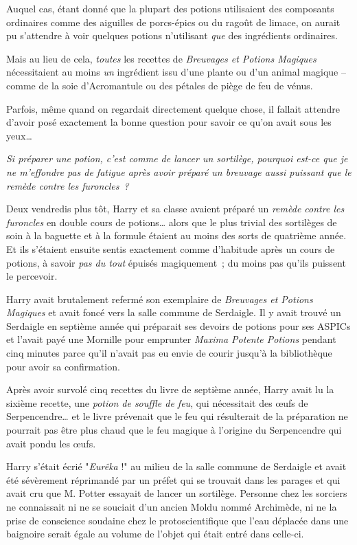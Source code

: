Auquel cas, étant donné que la plupart des potions utilisaient des composants ordinaires comme des aiguilles de porcs-épics ou du ragoût de limace, on aurait pu s'attendre à voir quelques potions n'utilisant \emph{que} des ingrédients ordinaires.

Mais au lieu de cela, \emph{toutes} les recettes de \emph{Breuvages et Potions Magiques} nécessitaient au moins \emph{un} ingrédient issu d'une plante ou d'un animal magique -- comme de la soie d'Acromantule ou des pétales de piège de feu de vénus.

Parfois, même quand on regardait directement quelque chose, il fallait attendre d'avoir posé exactement la bonne question pour savoir ce qu'on avait sous les yeux…

\emph{Si préparer une potion, c'est comme de lancer un sortilège, pourquoi est-ce que je ne m'effondre pas de fatigue après avoir préparé un breuvage aussi puissant que le remède contre les furoncles~?}

Deux vendredis plus tôt, Harry et sa classe avaient préparé un \emph{remède contre les furoncles} en double cours de potions… alors que le plus trivial des sortilèges de soin à la baguette et à la formule étaient au moins des sorts de quatrième année. Et ils s'étaient ensuite sentis exactement comme d'habitude après un cours de potions, à savoir \emph{pas du tout} épuisés magiquement~; du moins pas qu'ils puissent le percevoir.

Harry avait brutalement refermé son exemplaire de \emph{Breuvages et Potions Magiques} et avait foncé vers la salle commune de Serdaigle. Il y avait trouvé un Serdaigle en septième année qui préparait ses devoirs de potions pour ses ASPICs et l'avait payé une Mornille pour emprunter \emph{Maxima Potente Potions} pendant cinq minutes parce qu'il n'avait pas eu envie de courir jusqu'à la bibliothèque pour avoir sa confirmation.

Après avoir survolé cinq recettes du livre de septième année, Harry avait lu la sixième recette, une \emph{potion de souffle de feu}, qui nécessitait des œufs de Serpencendre… et le livre prévenait que le feu qui résulterait de la préparation ne pourrait pas être plus chaud que le feu magique à l'origine du Serpencendre qui avait pondu les œufs.

Harry s'était écrié "\emph{Eurêka} !" au milieu de la salle commune de Serdaigle et avait été sévèrement réprimandé par un préfet qui se trouvait dans les parages et qui avait cru que M. Potter essayait de lancer un sortilège. Personne chez les sorciers ne connaissait ni ne se souciait d'un ancien Moldu nommé Archimède, ni ne la prise de conscience soudaine chez le protoscientifique que l'eau déplacée dans une baignoire serait égale au volume de l'objet qui était entré dans celle-ci.

